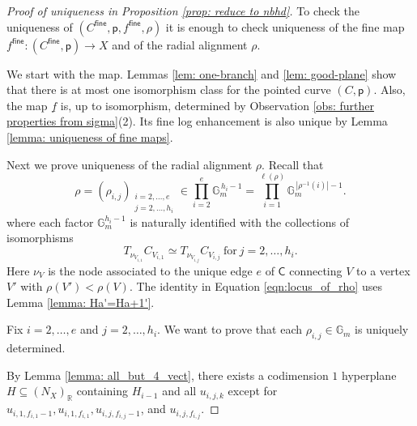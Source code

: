 \documentclass{article}
\def\R{\mathbb{R}}
\newcommand{\fine}{\mathsf{fine}}
\begin{document}
\begin{proof}[Proof of uniqueness in Proposition \ref{prop: reduce to nbhd}]

    To check the uniqueness of $(C^\fine ,\mathsf{p},f^\fine,\rho)$ it is enough to check uniqueness of the fine map $f^\fine : (C^\fine, \mathsf{p}) \to X$ and of the radial alignment $\rho$. 
    
   We start with the map. Lemmas \ref{lem: one-branch} and \ref{lem: good-plane} show that there is at most one isomorphism class for the pointed curve $(C,\mathsf{p})$. Also, the map $\underline{f}$ is, up to isomorphism, determined by Observation \ref{obs: further properties from sigma}(2). Its fine log enhancement is also unique by Lemma \ref{lemma: uniqueness of fine maps}. 

    Next we prove uniqueness of the radial alignment $\rho$. Recall that 
\begin{equation}\label{eqn:locus_of_rho}
\rho = (\rho_{i,j})_{\substack{i=2,\ldots,e \\ j=2,\ldots,h_i}}
\in \prod_{i=2}^e \mathbb{G}_m^{\,h_i-1}
=
\prod_{i=1}^{\ell(\rho)} \mathbb{G}_m^{\,|\rho^{-1}(i)|-1}.
\end{equation}
where each factor $\mathbb{G}_m^{h_i-1}$ is naturally identified with the collections of isomorphisms
\begin{equation}
 T_{\nu_{V_{i,1}}}C_{V_{i,1}} \simeq T_{\nu_{V_{i,j}}}C_{V_{i,j}}  \ \text{for} \ j=2,\ldots, h_i.
\end{equation}
Here $\nu_V$ is the node associated to the unique edge $e$ of $\mathsf{C}$ connecting $V$ to a vertex $V'$ with $\rho(V') < \rho(V)$. The identity in Equation \eqref{eqn:locus_of_rho} uses Lemma \ref{lemma: Ha'=Ha+1'}.

Fix $i=2,\ldots, e$ and $j=2,\ldots,h_i$. We want to prove that each $\rho_{i,j} \in \mathbb{G}_m$ is uniquely determined.

By Lemma \ref{lemma: all_but_4_vect}, there exists a codimension $1$ hyperplane $H \subseteq (N_X)_\R$ containing $H_{i-1}$ and all $u_{i,j,k}$ except for $u_{i,1, f_{i,1}-1}, u_{i,1, f_{i,1}}, u_{i,j,f_{i,j}-1}$, and $u_{i,j,f_{i,j}}$. 


\end{proof}
\end{document}
